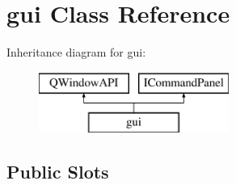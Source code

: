 \hypertarget{classgui}{
\section{gui Class Reference}
\label{classgui}
}
Inheritance diagram for gui:\begin{figure}[H]
\begin{center}
\leavevmode
\includegraphics[height=2.000000cm]{classgui}
\end{center}
\end{figure}
\subsection*{Public Slots}
